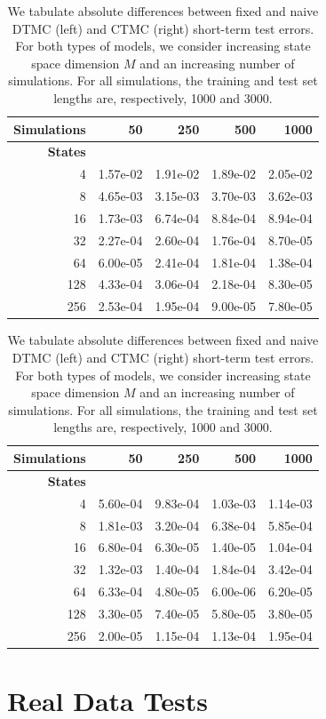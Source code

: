\documentclass[review,letterpaper,11pt]{elsarticle}
\begin{document}
\begin{table}[tbh]
\centering
\begin{tabular}{rrrrr} \toprule
\textbf{Simulations} & 50 & 250 & 500 & 1000 \\
  \midrule
\textbf{States} & & & & \\
4 & 1.57e-02 & 1.91e-02 & 1.89e-02 & 2.05e-02 \\
  8 & 4.65e-03 & 3.15e-03 & 3.70e-03 & 3.62e-03 \\
  16 & 1.73e-03 & 6.74e-04 & 8.84e-04 & 8.94e-04 \\
  32 & 2.27e-04 & 2.60e-04 & 1.76e-04 & 8.70e-05 \\
  64 & 6.00e-05 & 2.41e-04 & 1.81e-04 & 1.38e-04 \\
  128 & 4.33e-04 & 3.06e-04 & 2.18e-04 & 8.30e-05 \\
  256 & 2.53e-04 & 1.95e-04 & 9.00e-05 & 7.80e-05 \\
   \bottomrule
\end{tabular} \hspace{1cm}
\begin{tabular}{rrrrr} \toprule
\textbf{Simulations} & 50 & 250 & 500 & 1000 \\
  \midrule
\textbf{States} & & & & \\
4 & 5.60e-04 & 9.83e-04 & 1.03e-03 & 1.14e-03 \\ 
  8 & 1.81e-03 & 3.20e-04 & 6.38e-04 & 5.85e-04 \\ 
  16 & 6.80e-04 & 6.30e-05 & 1.40e-05 & 1.04e-04 \\ 
  32 & 1.32e-03 & 1.40e-04 & 1.84e-04 & 3.42e-04 \\ 
  64 & 6.33e-04 & 4.80e-05 & 6.00e-06 & 6.20e-05 \\ 
  128 & 3.30e-05 & 7.40e-05 & 5.80e-05 & 3.80e-05 \\ 
  256 & 2.00e-05 & 1.15e-04 & 1.13e-04 & 1.95e-04 \\ 
  \bottomrule
\end{tabular}
	\caption{We tabulate absolute differences between fixed and naive DTMC (left) and CTMC (right) short-term test errors.  For both types of models, we consider increasing state space dimension $M$ and an increasing number of simulations.  For all simulations, the training and test set lengths are, respectively, 1000 and 3000.}
      \label{tab:STerrors}
\end{table}

\section{Real Data Tests}
\label{sect:realdata}
\end{document}
